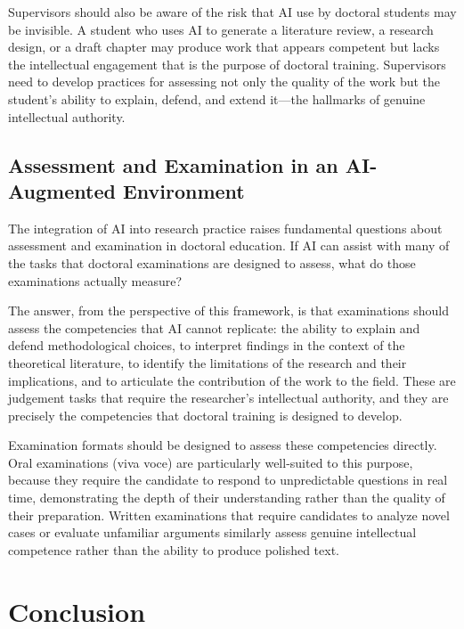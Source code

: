 \documentclass[12pt, a4paper]{article}
\begin{document}
Supervisors should also be aware of the risk that AI use by doctoral students may be invisible. A student who uses AI to generate a literature review, a research design, or a draft chapter may produce work that appears competent but lacks the intellectual engagement that is the purpose of doctoral training. Supervisors need to develop practices for assessing not only the quality of the work but the student's ability to explain, defend, and extend it---the hallmarks of genuine intellectual authority.

\subsection{Assessment and Examination in an AI-Augmented Environment}

The integration of AI into research practice raises fundamental questions about assessment and examination in doctoral education. If AI can assist with many of the tasks that doctoral examinations are designed to assess, what do those examinations actually measure?

The answer, from the perspective of this framework, is that examinations should assess the competencies that AI cannot replicate: the ability to explain and defend methodological choices, to interpret findings in the context of the theoretical literature, to identify the limitations of the research and their implications, and to articulate the contribution of the work to the field. These are judgement tasks that require the researcher's intellectual authority, and they are precisely the competencies that doctoral training is designed to develop.

Examination formats should be designed to assess these competencies directly. Oral examinations (viva voce) are particularly well-suited to this purpose, because they require the candidate to respond to unpredictable questions in real time, demonstrating the depth of their understanding rather than the quality of their preparation. Written examinations that require candidates to analyze novel cases or evaluate unfamiliar arguments similarly assess genuine intellectual competence rather than the ability to produce polished text.

\section{Conclusion}
\end{document}
